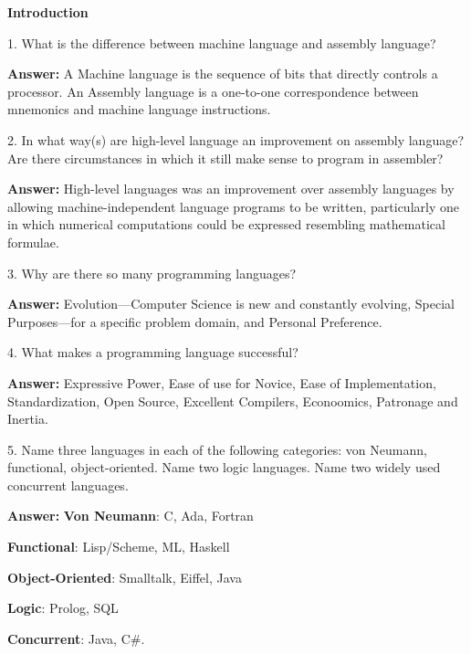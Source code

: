\centerline{\bf Introduction}

\vskip 1cm

1. What is the difference between machine language and assembly language?

\vskip 3mm

{\bf Answer:} A Machine language is the sequence of bits that directly controls a processor. An Assembly language is a one-to-one correspondence between mnemonics and machine language instructions.

\filbreak
\vskip 1cm

2. In what way(s) are high-level language an improvement on assembly language? Are there circumstances in which it still make sense to program in assembler?

\vskip 3mm

{\bf Answer:} High-level languages was an improvement over assembly languages by allowing machine-independent language programs to be written, particularly one in which numerical computations could be expressed resembling mathematical formulae.

\filbreak
\vskip 1cm
3. Why are there so many programming languages?

\vskip 3mm

{\bf Answer:} Evolution---Computer Science is new and constantly evolving, Special Purposes---for a specific problem domain, and Personal Preference.

\filbreak
\vskip 1cm
4. What makes a programming language successful?

\vskip 3mm
{\bf Answer:} Expressive Power, Ease of use for Novice, Ease of Implementation, Standardization, Open Source, Excellent Compilers, Econoomics, Patronage and Inertia.

\filbreak
\vskip 1cm

5. Name three languages in each of the following categories: von Neumann, functional, object-oriented. Name two logic languages. Name two widely used concurrent languages.

\vskip 3mm
{\bf Answer:} {\bf Von Neumann}: C, Ada, Fortran

\vskip 1mm
{\bf Functional}: Lisp/Scheme, ML, Haskell

\vskip 1mm
{\bf Object-Oriented}: Smalltalk, Eiffel, Java

\vskip 1mm
{\bf Logic}: Prolog, SQL

\vskip 1mm
{\bf Concurrent}: Java, C$\#$.

\filbreak
\vskip 1cm

